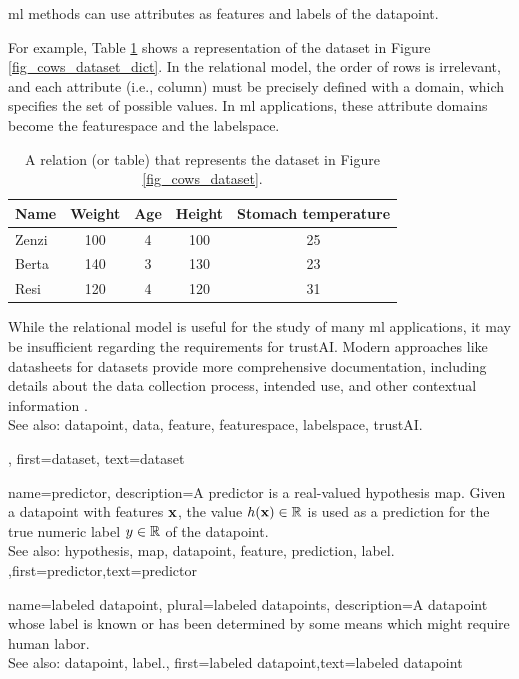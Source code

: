 {{\begin{itemize}
		\gls{ml} methods can use attributes as \glspl{feature} and \glspl{label} of the \gls{datapoint}.
		\end{itemize}
		For example, Table \ref{tab:cowdata_dict} shows a representation of the dataset in Figure \ref{fig_cows_dataset_dict}. 
		In the relational \gls{model}, the order of rows is irrelevant, and each attribute (i.e., column) must be 
		precisely defined with a domain, which specifies the set of possible values. In \gls{ml} applications, 
		these attribute domains become the \gls{featurespace} and the \gls{labelspace}.
		\begin{table}[H]
			\centering
			\begin{tabular}{lcccc}
				\hline
				\textbf{Name} & \textbf{Weight} & \textbf{Age} & \textbf{Height} & \textbf{Stomach temperature} \\
				\hline
				Zenzi & 100 & 4 & 100 & 25 \\
				Berta & 140 & 3 & 130 & 23 \\
				Resi  & 120 & 4 & 120 & 31 \\
				\hline
			\end{tabular}
			\caption{A relation (or table) that represents the dataset in Figure \ref{fig_cows_dataset}.}
			\label{tab:cowdata_dict}
		\end{table}
 While the relational \gls{model} is useful for the study of many \gls{ml} applications, it may be 
 insufficient regarding the requirements for \gls{trustAI}. Modern 
 approaches like datasheets for datasets provide more comprehensive 
 documentation, including details about the \gls{data} collection process, intended 
 use, and other contextual information \cite{DatasheetData2021}.
 		\\
		See also: \gls{datapoint}, \gls{data}, \gls{feature}, \gls{featurespace}, \gls{labelspace}, \gls{trustAI}.},
 first={dataset},
 text={dataset}  
}

{name={predictor},
	description={A predictor is a real-valued \gls{hypothesis} \gls{map}. 
		Given a \gls{datapoint} with \glspl{feature} ${\bf x}$, the value 
		$h({\bf x}) \in \mathbb{R}$ is used as a \gls{prediction} for the true 
		numeric \gls{label} $y \in \mathbb{R}$ of the \gls{datapoint}.
				\\
		See also: \gls{hypothesis}, \gls{map}, \gls{datapoint}, \gls{feature}, \gls{prediction}, \gls{label}. },first={predictor},text={predictor}  
}

{name={labeled datapoint}, plural={labeled datapoints},
 description={A \gls{datapoint} whose \gls{label} is known or has been determined 
 	by some means which might require human labor.
			\\
		See also: \gls{datapoint}, \gls{label}.},
 first={labeled datapoint},text={labeled datapoint}  
}

